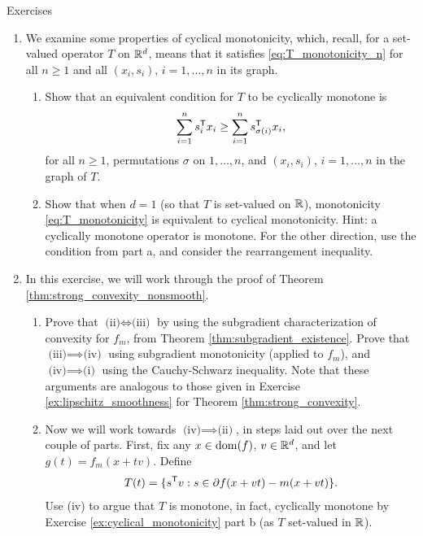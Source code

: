 \begin{xcb}{Exercises}
\begin{enumerate}[label=\thechapter.\arabic*]
\item \label{ex:cyclical_monotonicity}
  We examine some properties of cyclical monotonicity, which, recall, for a 
  set-valued operator $T$ on $\mathbb{R}^d$, means that it satisfies
  \eqref{eq:T_monotonicity_n} for all $n \geq 1$ and all $(x_i, s_i)$,
  $i=1,\ldots,n$ in its graph.   

\begin{enumerate}[label=\alph*.]
\item Show that an equivalent condition for $T$ to be cyclically monotone is
  \[
  \sum_{i=1}^n s_i^{\mathsf{T}} x_i \geq \sum_{i=1}^n s_{\sigma(i)}^{\mathsf{T}} x_i,
  \]
  for all $n \geq 1$, permutations $\sigma$ on $1,\ldots,n$, and $(x_i, s_i)$,
  $i=1,\ldots,n$ in the graph of $T$.  

\item Show that when $d=1$ (so that $T$ is set-valued on $\mathbb{R}$), 
  monotonicity \eqref{eq:T_monotonicity} is equivalent to cyclical
  monotonicity. Hint: a cyclically monotone operator is monotone. For the other
  direction, use the condition from part a, and consider the rearrangement
  inequality.        

\end{enumerate}

\item \label{ex:strong_convexity_nonsmooth}
  In this exercise, we will work through the proof of Theorem
  \ref{thm:strong_convexity_nonsmooth}. 

\begin{enumerate}[label=\alph*.]
\item Prove that $\text{(ii)} \iff \text{(iii)}$ by using the subgradient
  characterization of convexity for $f_m$, from Theorem
  \ref{thm:subgradient_existence}. Prove that $\text{(iii)} \implies
  \text{(iv)}$ using subgradient monotonicity (applied to $f_m$), and
  $\text{(iv)} \implies \text{(i)}$ using the Cauchy-Schwarz inequality. Note
  that these arguments are analogous to those given in Exercise 
  \ref{ex:lipschitz_smoothness} for Theorem \ref{thm:strong_convexity}.   
  
\item Now we will work towards $\text{(iv)} \implies \text{(ii)}$, in steps laid
  out over the next couple of parts. First, fix any $x \in \operatorname{dom}(f)$, $v \in
  \mathbb{R}^d$, and let $g(t) = f_m(x + tv)$. Define 
  \[
  T(t) = \{ s^{\mathsf{T}} v : s \in \partial f(x+vt) - m(x+vt) \}.
  \]
  Use (iv) to argue that $T$ is monotone, in fact, cyclically monotone by
  Exercise \ref{ex:cyclical_monotonicity} part b (as $T$ set-valued in $\mathbb{R}$). 


\end{enumerate}
\end{enumerate}
\end{xcb}

